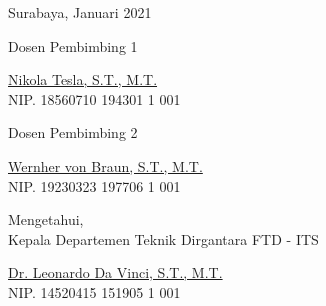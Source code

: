 \begin{flushright}
  Surabaya, Januari 2021
\end{flushright}
\vspace{1ex}

\begin{center}

  \begin{multicols}{2}

    Dosen Pembimbing 1
    \vspace{12ex}

    \underline{Nikola Tesla, S.T., M.T.} \\
    NIP. 18560710 194301 1 001

    \columnbreak

    Dosen Pembimbing 2
    \vspace{12ex}

    \underline{Wernher von Braun, S.T., M.T.} \\
    NIP. 19230323 197706 1 001

  \end{multicols}
  \vspace{6ex}

  Mengetahui, \\
  Kepala Departemen Teknik Dirgantara FTD - ITS
  \vspace{12ex}

  \underline{Dr. Leonardo Da Vinci, S.T., M.T.} \\
  NIP. 14520415 151905 1 001

\end{center}
